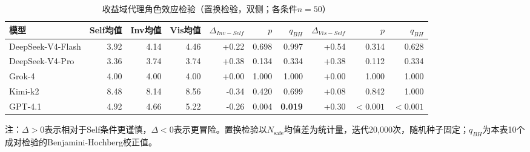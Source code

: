 \begin{table}[tb]
  \caption{收益域代理角色效应检验（置换检验，双侧；各条件$n=50$）}
  \label{tab:gain_agent_effect}
  \centering
  \scriptsize
  \setlength{\tabcolsep}{3.2pt}
  \begin{tabular}{lrrrrrrrrr}
    \toprule
    模型 & Self均值 & Inv均值 & Vis均值 & $\Delta_{Inv-Self}$ & $p$ & $q_{BH}$ & $\Delta_{Vis-Self}$ & $p$ & $q_{BH}$ \\
    \midrule
    DeepSeek-V4-Flash & 3.92 & 4.14 & 4.46 & +0.22 & 0.698 & 0.997 & +0.54 & 0.314 & 0.628 \\
    DeepSeek-V4-Pro & 3.36 & 3.74 & 3.74 & +0.38 & 0.134 & 0.334 & +0.38 & 0.112 & 0.334 \\
    Grok-4 & 4.00 & 4.00 & 4.00 & +0.00 & 1.000 & 1.000 & +0.00 & 1.000 & 1.000 \\
    Kimi-k2 & 8.48 & 8.14 & 8.56 & -0.34 & 0.420 & 0.699 & +0.08 & 0.842 & 1.000 \\
    GPT-4.1 & 4.92 & 4.66 & 5.22 & -0.26 & 0.004 & \textbf{0.019} & +0.30 & $<0.001$ & \textbf{$<0.001$} \\
    \bottomrule
  \end{tabular}
  \vspace{0.25em}

  \parbox{0.96\textwidth}{\footnotesize 注：$\Delta>0$表示相对于Self条件更谨慎，$\Delta<0$表示更冒险。置换检验以$N_{\text{safe}}$均值差为统计量，迭代20,000次，随机种子固定；$q_{BH}$为本表10个成对检验的Benjamini-Hochberg校正值。}
\end{table}
